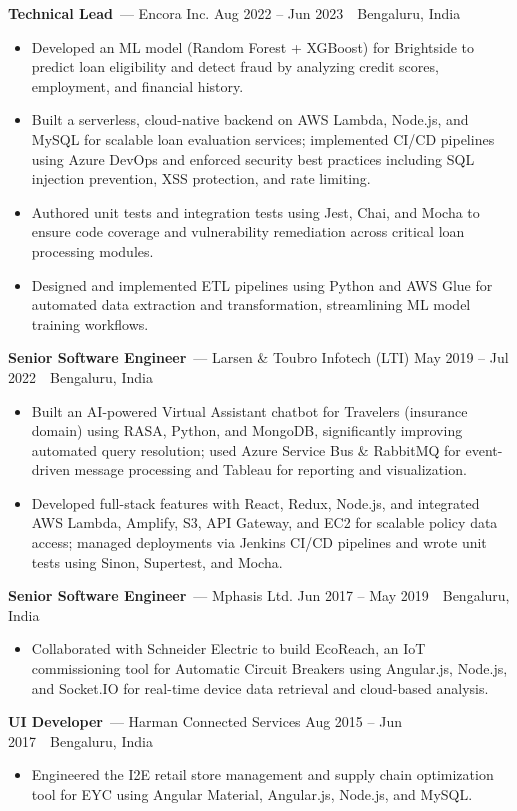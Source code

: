 \documentclass[10pt, letterpaper]{article}
\newcommand{\jobtitle}[4]{%
  \vspace{1pt}\noindent
  {\fontsize{10.5}{12}\bfseries\color{textmain}#1}\ {\color{textmuted}--- #2}
  \hfill{\fontsize{9}{11}\color{textmuted}#3\ \textperiodcentered\ #4}\vspace{1pt}}
\begin{document}
\jobtitle{Technical Lead}{Encora Inc.}{Aug 2022 -- Jun 2023}{Bengaluru, India}
\begin{itemize}
  \item Developed an ML model (Random Forest + XGBoost) for Brightside to predict loan eligibility and detect fraud by analyzing credit scores, employment, and financial history.
  \item Built a serverless, cloud-native backend on AWS Lambda, Node.js, and MySQL for scalable loan evaluation services; implemented CI/CD pipelines using Azure DevOps and enforced security best practices including SQL injection prevention, XSS protection, and rate limiting.
  \item Authored unit tests and integration tests using Jest, Chai, and Mocha to ensure code coverage and vulnerability remediation across critical loan processing modules.
  \item Designed and implemented ETL pipelines using Python and AWS Glue for automated data extraction and transformation, streamlining ML model training workflows.
\end{itemize}

\jobtitle{Senior Software Engineer}{Larsen \& Toubro Infotech (LTI)}{May 2019 -- Jul 2022}{Bengaluru, India}
\begin{itemize}
  \item Built an AI-powered Virtual Assistant chatbot for Travelers (insurance domain) using RASA, Python, and MongoDB, significantly improving automated query resolution; used Azure Service Bus \& RabbitMQ for event-driven message processing and Tableau for reporting and visualization.
  \item Developed full-stack features with React, Redux, Node.js, and integrated AWS Lambda, Amplify, S3, API Gateway, and EC2 for scalable policy data access; managed deployments via Jenkins CI/CD pipelines and wrote unit tests using Sinon, Supertest, and Mocha.
\end{itemize}

\jobtitle{Senior Software Engineer}{Mphasis Ltd.}{Jun 2017 -- May 2019}{Bengaluru, India}
\begin{itemize}
  \item Collaborated with Schneider Electric to build EcoReach, an IoT commissioning tool for Automatic Circuit Breakers using Angular.js, Node.js, and Socket.IO for real-time device data retrieval and cloud-based analysis.
\end{itemize}

\jobtitle{UI Developer}{Harman Connected Services}{Aug 2015 -- Jun 2017}{Bengaluru, India}
\begin{itemize}
  \item Engineered the I2E retail store management and supply chain optimization tool for EYC using Angular Material, Angular.js, Node.js, and MySQL.
\end{itemize}
\end{document}

